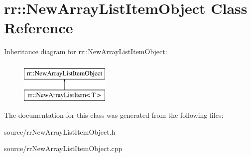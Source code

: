 \hypertarget{classrr_1_1_new_array_list_item_object}{\section{rr\-:\-:New\-Array\-List\-Item\-Object Class Reference}
\label{classrr_1_1_new_array_list_item_object}
}
Inheritance diagram for rr\-:\-:New\-Array\-List\-Item\-Object\-:\begin{figure}[H]
\begin{center}
\leavevmode
\includegraphics[height=2.000000cm]{classrr_1_1_new_array_list_item_object}
\end{center}
\end{figure}


The documentation for this class was generated from the following files\-:\begin{DoxyCompactItemize}
\item 
source/rr\-New\-Array\-List\-Item\-Object.\-h\item 
source/rr\-New\-Array\-List\-Item\-Object.\-cpp\end{DoxyCompactItemize}
